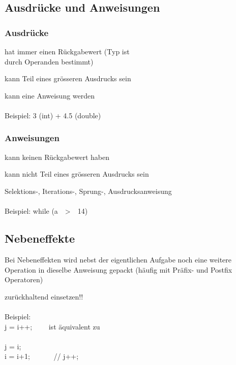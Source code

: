 		\begin{minipage}[t]{8 cm}	
			\subsection{Ausdrücke und Anweisungen}
				\subsubsection{Ausdrücke}
					\begin{compactitem}
						\item hat immer einen Rückgabewert (Typ ist\\ durch Operanden bestimmt)
						\item kann Teil eines grösseren Ausdrucks sein
						\item kann eine Anweisung werden\\\\Beispiel: 3 (int) + 4.5 (double)
					\end{compactitem}
				\subsubsection{Anweisungen}
					\begin{compactitem}
						\item kann keinen Rückgabewert haben
						\item kann nicht Teil eines grösseren Ausdrucks sein
						\item Selektions-, Iterations-, Sprung-, Ausdrucksanweisung\\\\
						Beispiel: while (a\ \ \textgreater\ \ 14)
					\end{compactitem}
		\end{minipage}
		\hspace*{1cm}
		\begin{minipage}[t]{9 cm}
			\subsection{Nebeneffekte}
				\begin{compactitem}
					\item Bei Nebeneffekten wird nebst der eigentlichen Aufgabe noch eine weitere
					Operation in dieselbe Anweisung gepackt (häufig mit Präfix- und Postfix Operatoren)
					\item zurückhaltend einsetzen!!\\\\
					Beispiel:\\
					j = i++;
					\ \ \ \ ist äquivalent zu\\\\
					j = i;\\
					i = i+1; \ \ \ \ \ \ // j++; 	
				\end{compactitem}
		\end{minipage}

